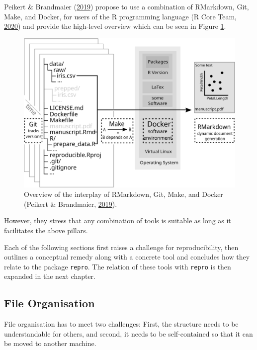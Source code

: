\documentclass[12pt,a4paper,twoside]{article}
\begin{document}
Peikert \& Brandmaier (\protect\hyperlink{ref-peikertReproducibleDataAnalysis2019}{2019}) propose to use a combination of RMarkdown, Git, Make, and Docker, for users of the R programming language (R Core Team, \protect\hyperlink{ref-R-base}{2020}) and provide the high-level overview which can be seen in Figure \ref{fig:nutshell}.



\begin{figure}

{\centering \includegraphics[width=1\linewidth]{images/nutshell} 

}

\caption{Overview of the interplay of RMarkdown, Git, Make, and Docker (Peikert \& Brandmaier, \protect\hyperlink{ref-peikertReproducibleDataAnalysis2019}{2019}).}\label{fig:nutshell}
\end{figure}

However, they stress that any combination of tools is suitable as long as it facilitates the above pillars.

Each of the following sections first raises a challenge for reproducibility, then outlines a conceptual remedy along with a concrete tool and concludes how they relate to the package \texttt{repro}.
The relation of these tools with \texttt{repro} is then expanded in the next chapter.

\hypertarget{file-organisation}{%
\subsection{File Organisation}\label{file-organisation}}

File organisation has to meet two challenges: First, the structure needs to be understandable for others, and second, it needs to be self-contained so that it can be moved to another machine.
\end{document}
